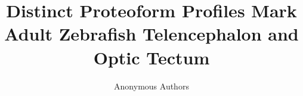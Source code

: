 \documentclass[11pt]{article}
\title{Distinct Proteoform Profiles Mark Adult Zebrafish Telencephalon and Optic Tectum}
\author{Anonymous Authors}
\date{}
\begin{document}
\maketitle

\begin{abstract}

\end{abstract}










\appendix
\scriptsize

\end{document}
